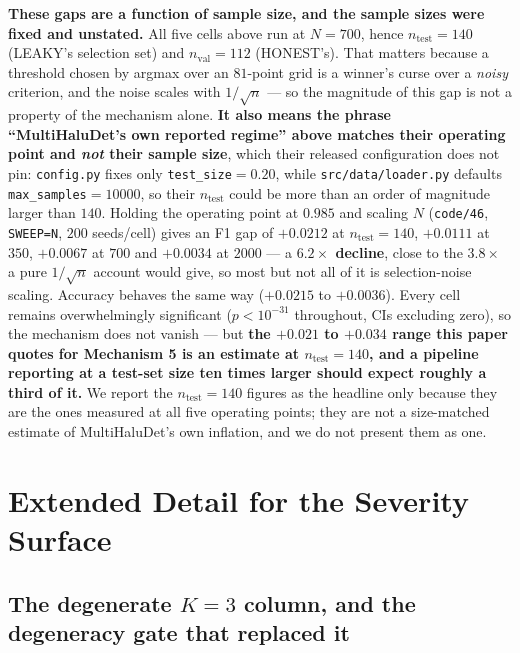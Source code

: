 \documentclass[10pt]{article} %
\begin{document}
\textbf{These gaps are a function of sample size, and the sample sizes were
fixed and unstated.} All five cells above run at $N=700$, hence
$n_{\text{test}}=140$ (LEAKY's selection set) and $n_{\text{val}}=112$
(HONEST's). That matters because a threshold chosen by argmax over an
$81$-point grid is a winner's curse over a \emph{noisy} criterion, and the
noise scales with $1/\sqrt{n}$ --- so the magnitude of this gap is not a
property of the mechanism alone. \textbf{It also means the phrase
``MultiHaluDet's own reported regime'' above matches their operating point and
\emph{not} their sample size}, which their released configuration does not
pin: \texttt{config.py} fixes only \texttt{test\_size}$=0.20$, while
\texttt{src/data/loader.py} defaults \texttt{max\_samples}$=10000$, so their
$n_{\text{test}}$ could be more than an order of magnitude larger than $140$.
Holding the operating point at $0.985$ and scaling $N$ (\texttt{code/46},
\texttt{SWEEP=N}, $200$ seeds/cell) gives an F1 gap of $+0.0212$ at
$n_{\text{test}}=140$, $+0.0111$ at $350$, $+0.0067$ at $700$ and $+0.0034$ at
$2000$ --- a \textbf{$6.2\times$ decline}, close to the $3.8\times$ a pure
$1/\sqrt{n}$ account would give, so most but not all of it is selection-noise
scaling. Accuracy behaves the same way ($+0.0215$ to $+0.0036$). Every cell
remains overwhelmingly significant ($p<10^{-31}$ throughout, CIs excluding
zero), so the mechanism does not vanish --- but \textbf{the $+0.021$ to
$+0.034$ range this paper quotes for Mechanism 5 is an estimate at
$n_{\text{test}}=140$, and a pipeline reporting at a test-set size ten times
larger should expect roughly a third of it.} We report the $n_{\text{test}}=140$
figures as the headline only because they are the ones measured at all five
operating points; they are not a size-matched estimate of MultiHaluDet's own
inflation, and we do not present them as one.

\section{Extended Detail for the Severity Surface}

\subsection{The degenerate $K=3$ column, and the degeneracy gate that replaced it}
\end{document}
